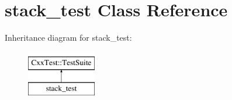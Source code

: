 \hypertarget{classstack__test}{\section{stack\-\_\-test Class Reference}
\label{classstack__test}
}
Inheritance diagram for stack\-\_\-test\-:\begin{figure}[H]
\begin{center}
\leavevmode
\includegraphics[height=2.000000cm]{classstack__test}
\end{center}
\end{figure}

